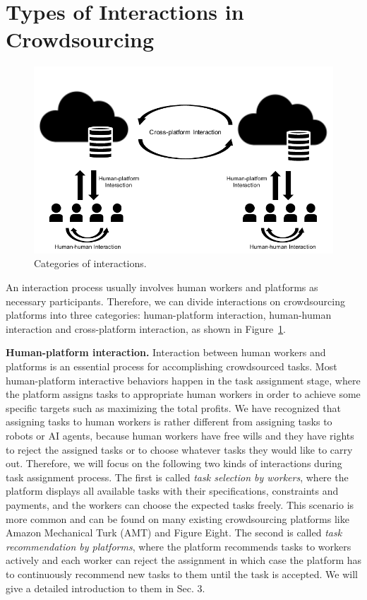 \documentclass[11pt]{article}
\newcommand\figref[1]{Figure~\ref{#1}}
\newcommand{\fakeparagraph}[1]{\vspace{1mm}\noindent\textbf{#1.}}
\begin{document}
\section{Types of Interactions in Crowdsourcing}

\begin{figure}
\centering
\includegraphics[scale=0.9]{figs/category.pdf}

\caption{Categories of interactions.}
\label{fig:category}
\end{figure}

An interaction process usually involves human workers and platforms as necessary participants. 
Therefore, we can divide interactions on crowdsourcing platforms into three categories: human-platform interaction, human-human interaction and cross-platform interaction, as shown in \figref{fig:category}.

\fakeparagraph{Human-platform interaction}
Interaction between human workers and platforms is an essential process for accomplishing crowdsourced tasks. 
Most human-platform interactive behaviors happen in the task assignment stage, where the platform assigns tasks to appropriate human workers in order to achieve some specific targets such as maximizing the total profits. 
We have recognized that assigning tasks to human workers is rather different from assigning tasks to robots or AI agents, because human workers have free wills and they have rights to reject the assigned tasks or to choose whatever tasks they would like to carry out. 
Therefore, we will focus on the following two kinds of interactions during task assignment process. 
The first is called \textit{task selection by workers}, where the platform displays all available tasks with their specifications, constraints and payments, and the workers can choose the expected tasks freely. This scenario is more common and can be found on many existing crowdsourcing platforms like Amazon Mechanical Turk (AMT) and Figure Eight. 
The second is called \textit{task recommendation by platforms}, where the platform recommends tasks to workers actively and each worker can reject the assignment in which case the platform has to continuously recommend new tasks to them until the task is accepted. 
We will give a detailed introduction to them in Sec. 3.
\end{document}
